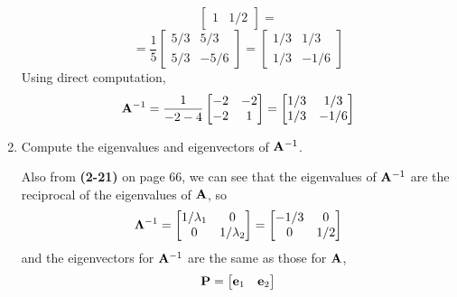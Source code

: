 \begin{enumerate}[label=(\alph*)]
\[\begin{bmatrix}
                    1 & 1/2
                \end{bmatrix}
                =
            \]
            \[
                =
                \frac{1}{5}
                \begin{bmatrix}
                    5/3 & 5/3 \\
                    5/3 & -5/6
                \end{bmatrix}
                =
                \begin{bmatrix}
                    1/3 & 1/3 \\
                    1/3 & -1/6
                \end{bmatrix}
            \]
            Using direct computation,
            \[
                \bold{A}^{-1}
                =
                \frac{1}{-2-4}
                \begin{bmatrix}
                    -2 & -2 \\
                    -2 & 1
                \end{bmatrix}
                =
                \begin{bmatrix}
                    1/3 & 1/3 \\
                    1/3 & -1/6
                \end{bmatrix}
            \]
            \item Compute the eigenvalues and eigenvectors of $\bold{A}^{-1}$.
            \par
            Also from \textbf{(2-21)} on page 66, we can see that the eigenvalues of $\bold{A}^{-1}$ are the reciprocal of the eigenvalues of $\bold{A}$, so
            \[
                \bold{\Lambda}^{-1}
                =
                \begin{bmatrix}
                    1/\lambda_1 & 0 \\
                    0 & 1/\lambda_2
                \end{bmatrix}
                =
                \begin{bmatrix}
                    -1/3 & 0 \\
                    0 & 1/2
                \end{bmatrix}
            \]
            and the eigenvectors for $\bold{A}^{-1}$ are the same as those for $\bold{A}$,
            \[
                \bold{P}
                =
                \begin{bmatrix}
                    \bold{e}_1 & \bold{e}_2
                \end{bmatrix}
\]
\end{enumerate}
